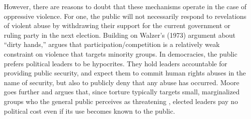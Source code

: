 \documentclass[11pt]{article}
\begin{document}
However, there are reasons to doubt that these mechanisms operate in the case of oppressive violence. For one, the public will not necessarily respond to revelations of violent abuse by withdrawing their support for the current government or ruling party in the next election. Building on Walzer's (1973) \nocite{Walzer1973} argument about ``dirty hands,'' \citet{Moore2010} argues that participation/competition is a relatively weak constraint on violence that targets minority groups. In democracies, the public prefers political leaders to be hypocrites. They hold leaders  accountable for providing public security, and expect them to commit human rights abuses in the name of security, but also to publicly deny that any abuse has occurred. Moore goes further and argues that, since torture typically targets small, marginalized groups who the general public perceives as threatening \citep{Rejali2007}, elected leaders pay no political cost even if its use becomes known to the public. 
\end{document}
